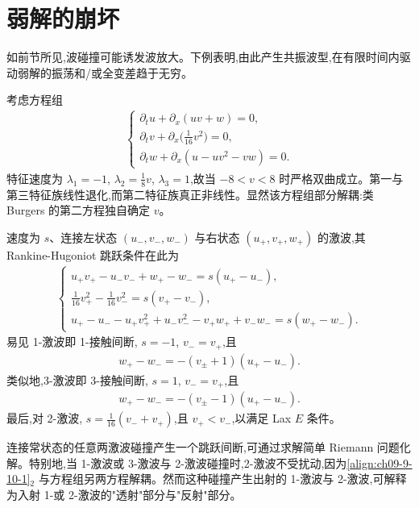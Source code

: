 \documentclass[../../main.tex]{subfiles}
\begin{document}
\section{弱解的崩坏}\label{section:ch09-弱解的崩坏}

如前节所见,波碰撞可能诱发波放大。下例表明,由此产生共振波型,在有限时间内驱动弱解的振荡和/或全变差趋于无穷。

考虑方程组
\begin{align}
\begin{cases}
\partial_{t}u+\partial_{x}(uv+w)=0,\\
\partial_{t}v+\partial_{x}\big(\frac{1}{16}v^{2}\big)=0,\\
\partial_{t}w+\partial_{x}(u-uv^{2}-vw)=0.
\end{cases}
\label{align:ch09-9-10-1}
\end{align}
特征速度为 $\lambda_{1}=-1$, $\lambda_{2}=\frac{1}{8}v$, $\lambda_{3}=1$,故当 $-8<v<8$ 时严格双曲成立。第一与第三特征族线性退化,而第二特征族真正非线性。显然该方程组部分解耦:类 Burgers 的第二方程独自确定 $v$。

速度为 $s$、连接左状态 $(u_{-},v_{-},w_{-})$ 与右状态 $(u_{+},v_{+},w_{+})$ 的激波,其 Rankine-Hugoniot 跳跃条件在此为
\begin{align}
\begin{cases}
u_{+}v_{+}-u_{-}v_{-}+w_{+}-w_{-}=s(u_{+}-u_{-}),\\
\frac{1}{16}v_{+}^{2}-\frac{1}{16}v_{-}^{2}=s(v_{+}-v_{-}),\\
u_{+}-u_{-}-u_{+}v_{+}^{2}+u_{-}v_{-}^{2}-v_{+}w_{+}+v_{-}w_{-}=s(w_{+}-w_{-}).
\end{cases}
\label{align:ch09-9-10-2}
\end{align}
易见 1-激波即 1-接触间断, $s=-1$, $v_{-}=v_{+}$,且
\begin{align}
w_{+}-w_{-}=-(v_{\pm}+1)(u_{+}-u_{-}).
\label{align:ch09-9-10-3aa}
\end{align}
类似地,3-激波即 3-接触间断, $s=1$, $v_{-}=v_{+}$,且
\begin{align}
w_{+}-w_{-}=-(v_{\pm}-1)(u_{+}-u_{-}).
\label{align:ch09-9-10-3ab}
\end{align}
最后,对 2-激波, $s=\frac{1}{16}(v_{-}+v_{+})$,且 $v_{+}<v_{-}$,以满足 Lax $E$ 条件。

连接常状态的任意两激波碰撞产生一个跳跃间断,可通过求解简单 Riemann 问题化解。特别地,当 1-激波或 3-激波与 2-激波碰撞时,2-激波不受扰动,因为\eqref{align:ch09-9-10-1}$_{2}$ 与方程组另两方程解耦。然而这种碰撞产生出射的 1-激波与 2-激波,可解释为入射 1-或 2-激波的"透射"部分与"反射"部分。
\end{document}
